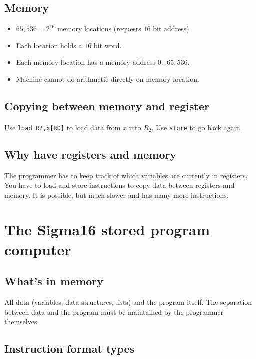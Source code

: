 \subsection{Memory}\label{sub:memory}

\begin{itemize}
	\item \(65,536 = 2^{16}\) memory locations (requesrs \(16\) bit address)
	\item Each location holds a \(16\) bit word.
	\item Each memory location has a memory address \(0\)...\(65,536\).
	\item Machine cannot do arithmetic directly on memory location.
\end{itemize}


\subsection{Copying between memory and register}\label{sub:copying_between_memory_and_register}

Use \texttt{load R2,x[R0]}  to load data from \(x\) into \(R_2\).
Use \texttt{store} to go back again.


\subsection{Why have registers and memory}\label{sub:why_have_registers_and_memory}

The programmer has to keep track of which variables are currently in registers.
You have to load and store instructions to copy data between registers and memory.
It is possible, but much slower and has many more instructions.

\section{The Sigma16 stored program computer}\label{sec:the_sigma16_stored_program_computer}

\subsection{What's in memory}\label{sub:what_s_in_memory}

All data (variables, data structures, lists) and the program itself.
The separation between data and the program must be maintained by the programmer themselves.

\subsection{Instruction format types}\label{sub:instruction_format_types}

